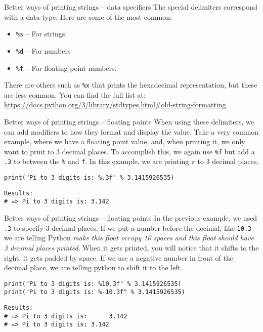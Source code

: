\documentclass[10pt]{beamer}
\begin{document}
\begin{frame}[label={sec:org946ad0a},fragile]{Better ways of printing strings -- data specifiers}
 The special delimiters correspond with a data type. Here are some of the most common:

\begin{itemize}
\item \texttt{\%s} -- For strings
\item \texttt{\%d} -- For numbers
\item \texttt{\%f} -- For floating point numbers.
\end{itemize}

There are others such as \texttt{\%x} that prints the hexadecimal representation, but these are
less common. You can find the full list at: \url{https://docs.python.org/3/library/stdtypes.html\#old-string-formatting}
\end{frame}

\begin{frame}[label={sec:org99f29a4},fragile]{Better ways of printing strings -- floating points}
 When using these delimiters, we can add modifiers to how they format and display the
value. Take a very common example, where we have a floating point value, and, when
printing it, we only want to print to 3 decimal places. To accomplish this, we again
use \texttt{\%f} but add a \texttt{.3} to between the \texttt{\%} and \texttt{f}. In this example, we are printing \(\pi\) to 3
decimal places.

\begin{verbatim}
print("Pi to 3 digits is: %.3f" % 3.1415926535)
\end{verbatim}

\begin{verbatim}
Results: 
# => Pi to 3 digits is: 3.142
\end{verbatim}
\end{frame}

\begin{frame}[label={sec:org2fc0171},fragile]{Better ways of printing strings -- floating points}
 In the previous example, we used \texttt{.3} to specify 3 decimal places. If we put a number
before the decimal, like \texttt{10.3} we are telling Python \emph{make this float occupy 10 spaces
and this float should have 3 decimal places printed}.  When it gets printed, you will
notice that it shifts to the right, it gets padded by space. If we use a negative
number in front of the decimal place, we are telling python to shift it to the left.

\begin{verbatim}
print("Pi to 3 digits is: %10.3f" % 3.1415926535)
print("Pi to 3 digits is: %-10.3f" % 3.1415926535)
\end{verbatim}

\begin{verbatim}
Results: 
# => Pi to 3 digits is:      3.142
# => Pi to 3 digits is: 3.142
\end{verbatim}
\end{frame}
\end{document}
